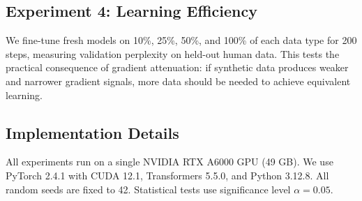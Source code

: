 \subsection{Experiment 4: Learning Efficiency}
\label{sec:exp4}

We fine-tune fresh \gptsmall models on 10\%, 25\%, 50\%, and 100\% of each data type for 200 steps, measuring validation perplexity on held-out human \wikitext data. This tests the practical consequence of gradient attenuation: if synthetic data produces weaker and narrower gradient signals, more data should be needed to achieve equivalent learning.

\subsection{Implementation Details}
\label{sec:impl}

All experiments run on a single NVIDIA RTX A6000 GPU (49 GB). We use PyTorch 2.4.1 with CUDA 12.1, Transformers 5.5.0, and Python 3.12.8. All random seeds are fixed to 42. Statistical tests use significance level $\alpha = 0.05$.
